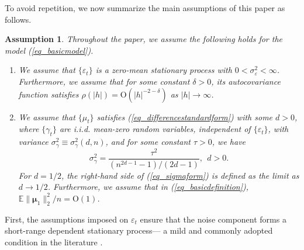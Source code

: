 \documentclass[11pt]{article}
\newtheorem{assumption}{Assumption}[section]
\newcommand{\OO}{\mathrm{O}}
\numberwithin{equation}{section}
\numberwithin{figure}{section}
\begin{document}
To avoid repetition, we now summarize the main assumptions of this paper as follows. 
\begin{assumption}\label{assum_mainassumption}
Throughout the paper, we assume the following holds for the model (\ref{eq_basicmodel}). 
\begin{enumerate}
\item We assume that $\{\varepsilon_t\}$ is a zero-mean stationary process with $0<\sigma_\varepsilon^2<\infty$. Furthermore, we assume that for some constant $\delta > 0$, its autocovariance function satisfies $ \rho(|h|) = \OO(|h|^{-2-\delta})$ as $|h| \rightarrow \infty$. 

\item We assume that $\{\mu_t\}$ satisfies (\ref{eq_differencestandardform}) with some $d > 0$, where $\{\gamma_t\}$ are i.i.d. mean-zero random variables, independent of $\{\varepsilon_t\}$, with variance $\sigma_\gamma^2 \equiv \sigma_\gamma^2(d,n)$, and for some constant $\tau > 0$, we have
\begin{equation}\label{eq_sigmaform}
\sigma_{\gamma}^{2}=\frac{\tau^{2}}{(n^{2d-1}-1)/(2d-1)}, \ \ d>0. 
\end{equation}
For $d = 1/2$, the right-hand side of (\ref{eq_sigmaform}) is defined as the limit as $d \to 1/2$. Furthermore, we assume that in (\ref{eq_basicdefinition}),  $\mathbb{E}\| \bm{\mu}_1 \|_2^2 / n = \OO(1)$.
\end{enumerate}

%
%
%
%
\end{assumption}

First, the assumptions imposed on ${\varepsilon_t}$ ensure that the noise component forms a short-range dependent stationary process— a mild and commonly adopted condition in the literature \cite{burman_shumway2009estimation,hang2006estimation,commandeur2007introduction,durbin2000,haldrup2007estimation,hartl2025robust}.  
\end{document}
